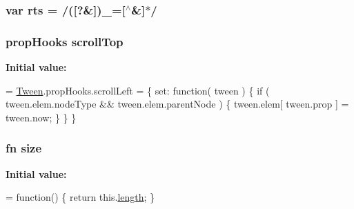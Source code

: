 \subsubsection[{rts}]{\setlength{\rightskip}{0pt plus 5cm}var rts = /(\mbox{[}?\&\mbox{]})\+\_\+=\mbox{[}$^\wedge$\&\mbox{]}$\ast$/}\label{_bibabook_2_scripts_2jquery-1_810_82_8js_a38ff30904f54277281a13514d7aea00d}
\hypertarget{_bibabook_2_scripts_2jquery-1_810_82_8js_a57beb1f611d6c8b84919b0f7d9e0e890}{}
\subsubsection[{scroll\+Top}]{ {\bf prop\+Hooks} scroll\+Top}\label{_bibabook_2_scripts_2jquery-1_810_82_8js_a57beb1f611d6c8b84919b0f7d9e0e890}
{\bfseries Initial value\+:}
\begin{DoxyCode}
= \hyperlink{_bibabook_2_scripts_2jquery-1_810_82_8js_a91e55267cc469e865a6a7c6cfc51c7b1}{Tween}.propHooks.scrollLeft = \{
    set: \textcolor{keyword}{function}( tween ) \{
        \textcolor{keywordflow}{if} ( tween.elem.nodeType && tween.elem.parentNode ) \{
            tween.elem[ tween.prop ] = tween.now;
        \}
    \}
\}
\end{DoxyCode}
\hypertarget{_bibabook_2_scripts_2jquery-1_810_82_8js_afa6806c6ee5e63d5177f1dcc082ba6bc}{}
\subsubsection[{size}]{ {\bf fn} size}\label{_bibabook_2_scripts_2jquery-1_810_82_8js_afa6806c6ee5e63d5177f1dcc082ba6bc}
{\bfseries Initial value\+:}
\begin{DoxyCode}
= \textcolor{keyword}{function}() \{
    \textcolor{keywordflow}{return} this.\hyperlink{jquery-1_810_82-vsdoc_8js_aa7de35d58da66d9944ab9cbe82c19640}{length};
\}
\end{DoxyCode}
\hypertarget{_bibabook_2_scripts_2jquery-1_810_82_8js_add98c90065e6563cba26ff6d2016c46c}{}
